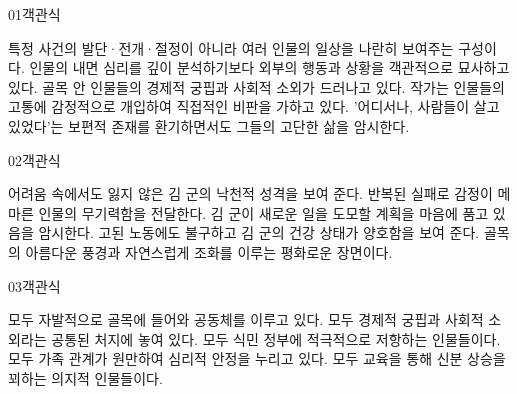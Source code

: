 \documentclass[fs85,seriesWit]{korfarm-base}
\begin{document}
\kfBeginMC
\begin{kfQBlock}{01}{객관식}
\begin{kfChoices}
\kfChoice 특정 사건의 발단·전개·절정이 아니라 여러 인물의 일상을 나란히 보여주는 구성이다.
\kfChoice 인물의 내면 심리를 깊이 분석하기보다 외부의 행동과 상황을 객관적으로 묘사하고 있다.
\kfChoice 골목 안 인물들의 경제적 궁핍과 사회적 소외가 드러나고 있다.
\kfChoice 작가는 인물들의 고통에 감정적으로 개입하여 직접적인 비판을 가하고 있다.
\kfChoice '어디서나, 사람들이 살고 있었다'는 보편적 존재를 환기하면서도 그들의 고단한 삶을 암시한다.
\end{kfChoices}
\end{kfQBlock}

\begin{kfQBlock}{02}{객관식}
\begin{kfChoices}
\kfChoice 어려움 속에서도 잃지 않은 김 군의 낙천적 성격을 보여 준다.
\kfChoice 반복된 실패로 감정이 메마른 인물의 무기력함을 전달한다.
\kfChoice 김 군이 새로운 일을 도모할 계획을 마음에 품고 있음을 암시한다.
\kfChoice 고된 노동에도 불구하고 김 군의 건강 상태가 양호함을 보여 준다.
\kfChoice 골목의 아름다운 풍경과 자연스럽게 조화를 이루는 평화로운 장면이다.
\end{kfChoices}
\end{kfQBlock}

\begin{kfQBlock}{03}{객관식}
\begin{kfChoices}
\kfChoice 모두 자발적으로 골목에 들어와 공동체를 이루고 있다.
\kfChoice 모두 경제적 궁핍과 사회적 소외라는 공통된 처지에 놓여 있다.
\kfChoice 모두 식민 정부에 적극적으로 저항하는 인물들이다.
\kfChoice 모두 가족 관계가 원만하여 심리적 안정을 누리고 있다.
\kfChoice 모두 교육을 통해 신분 상승을 꾀하는 의지적 인물들이다.
\end{kfChoices}
\end{kfQBlock}
\end{document}
